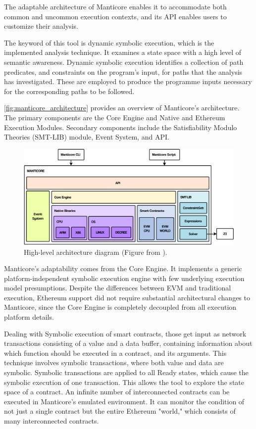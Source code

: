 The adaptable architecture of Manticore enables it to accommodate both common and uncommon execution contexts, 
and its API enables users to customize their analysis. 

The keyword of this tool is dynamic symbolic execution, which is the implemented analysis technique. 
It examines a state space with a high level of semantic awareness.
Dynamic symbolic execution identifies a collection of path predicates, and constraints on the program's input, 
for paths that the analysis has investigated.
These are employed to produce the programme inputs necessary for the corresponding paths to be followed. 

\autoref{fig:manticore_architecture} provides an overview of Manticore's architecture. The primary
components are the Core Engine and Native and Ethereum
Execution Modules. Secondary components include the Satisfiability Modulo Theories (SMT-LIB) module, Event System,
and API.
\begin{figure}
    \centering
    \includegraphics[width=13cm]{logos/ManticoreArchitecture.pdf}
    \caption{High-level architecture diagram (Figure from \cite{ManticorePaper}).}
    \label{fig:manticore_architecture}
\end{figure}

Manticore's adaptability comes from the Core Engine.
It implements a generic platform-independent symbolic execution engine with few underlying execution model presumptions. 
Despite the differences between  EVM and traditional execution,
Ethereum support did not require substantial architectural
changes to Manticore, since the Core Engine is completely
decoupled from all execution platform details.

Dealing with Symbolic execution of smart contracts, those get input as network transactions consisting of a value and a data buffer, 
containing information about which function should be executed in a contract, and its
arguments.
This technique involves symbolic transactions, where both value and data are symbolic. Symbolic transactions are applied to all Ready states, which
cause the symbolic execution of one transaction. This allows the tool to explore the state space of a contract.
An infinite number of interconnected contracts can be executed in Manticore's emulated environment.
It can monitor the condition of not just a single contract but the entire Ethereum "world," which consists of many interconnected contracts. 

